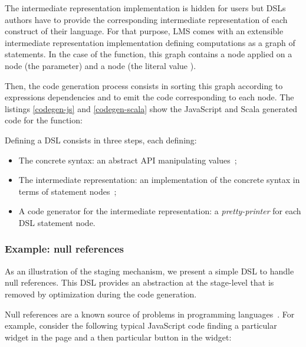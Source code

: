 \documentclass[runningheads,a4paper]{llncs}
\begin{document}
The intermediate representation implementation is hidden for users but DSLs authors have to provide the corresponding
intermediate representation of each construct of their language. For that purpose, LMS comes with an extensible
intermediate representation implementation defining computations as a graph of statements. In the case of the
 function, this graph contains a  node applied on a  node (the  parameter) and
a  node (the literal value ).

Then, the code generation process consists in sorting this graph according to expressions dependencies and to emit
the code corresponding to each node. The listings \ref{codegen-js} and \ref{codegen-scala} show the JavaScript and
Scala generated code for the  function:
\begin{multicols}{2}


\end{multicols}

Defining a DSL consists in three steps, each defining:

\begin{itemize}
\item The concrete syntax: an abstract API manipulating  values~;
\item The intermediate representation: an implementation of the concrete syntax in terms of statement nodes~;
\item A code generator for the intermediate representation: a \emph{pretty-printer} for each DSL statement node.
\end{itemize}

\subsubsection{Example: null references}

As an illustration of the staging mechanism, we present a simple DSL to handle null references. This DSL provides an
abstraction at the stage-level that is removed by optimization during the code generation.

Null references are a known source of problems in programming languages~\cite{Hoare09_Null,Nanda09_Null}. For
example, consider the following typical JavaScript code finding a particular widget in the page and a then particular
button in the widget:
\end{document}
